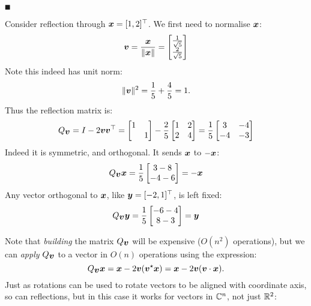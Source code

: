 \ensuremath{\QED}

\begin{example} Consider reflection through $\bm{{\mbox{\boldmath$x$\unboldmath}}} = [1,2]^\top$.  We first need to normalise $\bm{{\mbox{\boldmath$x$\unboldmath}}}$:
\[
\bm{{\mbox{\boldmath$v$\unboldmath}}} = {\bm{{\mbox{\boldmath$x$\unboldmath}}} \over \|\bm{{\mbox{\boldmath$x$\unboldmath}}}\|} = \begin{bmatrix} {1 \over \sqrt{5}} \\ {2 \over \sqrt{5}} \end{bmatrix}
\]
Note this indeed has unit norm:
\[
\|\bm{{\mbox{\boldmath$v$\unboldmath}}}\|^2 = {1 \over 5} + {4 \over 5} = 1.
\]
Thus the reflection matrix is:
\[
Q_{\bm{{\mbox{\boldmath$v$\unboldmath}}}} = I - 2 \bm{{\mbox{\boldmath$v$\unboldmath}}} \bm{{\mbox{\boldmath$v$\unboldmath}}}^\top = \begin{bmatrix}1 \\ & 1 \end{bmatrix} - {2 \over 5} \begin{bmatrix} 1 & 2 \\ 2 & 4 \end{bmatrix}
 =  {1 \over 5} \begin{bmatrix} 3 & -4 \\ -4 & -3 \end{bmatrix}
\]
Indeed it is symmetric, and orthogonal. It sends $\bm{{\mbox{\boldmath$x$\unboldmath}}}$ to $-\bm{{\mbox{\boldmath$x$\unboldmath}}}$:
\[
Q_{\bm{{\mbox{\boldmath$v$\unboldmath}}}} \bm{{\mbox{\boldmath$x$\unboldmath}}} = {1 \over 5} \begin{bmatrix}3 - 8 \\ -4 - 6 \end{bmatrix} = -\bm{{\mbox{\boldmath$x$\unboldmath}}}
\]
Any vector orthogonal to $\bm{{\mbox{\boldmath$x$\unboldmath}}}$, like $\bm{{\mbox{\boldmath$y$\unboldmath}}} = [-2,1]^\top$, is left fixed:
\[
Q_{\bm{{\mbox{\boldmath$v$\unboldmath}}}} \bm{{\mbox{\boldmath$y$\unboldmath}}} = {1 \over 5} \begin{bmatrix}-6 -4 \\ 8 - 3 \end{bmatrix} = \bm{{\mbox{\boldmath$y$\unboldmath}}}
\]
\end{example}

Note that \emph{building} the matrix $Q_{\bm{{\mbox{\boldmath$v$\unboldmath}}}}$ will be expensive ($O(n^2)$ operations), but we can \emph{apply} $Q_{\bm{{\mbox{\boldmath$v$\unboldmath}}}}$ to a vector in $O(n)$ operations using the expression:
\[
Q_{\bm{{\mbox{\boldmath$v$\unboldmath}}}} \bm{{\mbox{\boldmath$x$\unboldmath}}} = \bm{{\mbox{\boldmath$x$\unboldmath}}} - 2 \bm{{\mbox{\boldmath$v$\unboldmath}}} (\bm{{\mbox{\boldmath$v$\unboldmath}}}^\star \bm{{\mbox{\boldmath$x$\unboldmath}}}) = \bm{{\mbox{\boldmath$x$\unboldmath}}} - 2 \bm{{\mbox{\boldmath$v$\unboldmath}}} (\bm{{\mbox{\boldmath$v$\unboldmath}}} \cdot \bm{{\mbox{\boldmath$x$\unboldmath}}}).
\]
Just as rotations can be used to rotate vectors to be aligned with coordinate axis, so can reflections, but in this case it works for vectors in ${\mathbb C}^n$, not just ${\mathbb R}^2$:

